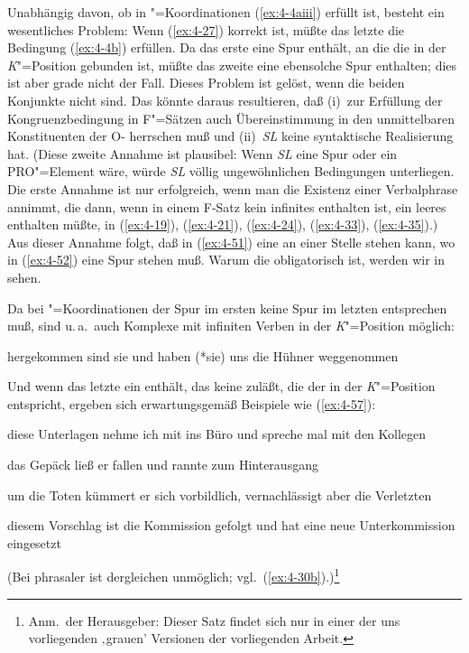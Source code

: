 \documentclass[output=paper]{langsci/langscibook}
\begin{document}
Unabhängig davon, ob in "=Koordinationen (\ref{ex:4-4aiii}) erfüllt ist, besteht ein wesentliches Problem: Wenn (\ref{ex:4-27}) korrekt ist, müßte das letzte  die Bedingung (\ref{ex:4-4b}) erfüllen. Da das erste  eine Spur enthält, an die die  in der \textit{K}{}"=Position gebunden ist, müßte das zweite  eine ebensolche Spur enthalten; dies ist aber grade nicht der Fall. Dieses Problem ist gelöst, wenn die beiden Konjunkte nicht  sind. Das könnte daraus resultieren, daß (i)~zur Erfüllung der Kongruenzbedingung in F"=Sätzen auch Übereinstimmung in den unmittelbaren Konstituenten der O- herrschen muß und (ii)~\textit{SL} keine syntaktische Realisierung hat. (Diese zweite Annahme ist plausibel: Wenn \textit{SL} eine Spur oder ein PRO"=Element wäre, würde \textit{SL} völlig ungewöhnlichen Bedingungen unterliegen. Die erste Annahme ist nur erfolgreich, wenn man die Existenz einer Verbalphrase annimmt, die dann, wenn in einem F-Satz kein infinites  enthalten ist, ein leeres  enthalten müßte, \zb in (\ref{ex:4-19}), (\ref{ex:4-21}), (\ref{ex:4-24}), (\ref{ex:4-33}), (\ref{ex:4-35}).) Aus dieser Annahme folgt, daß in (\ref{ex:4-51}) eine  an einer Stelle stehen kann, wo in (\ref{ex:4-52}) eine Spur stehen muß. Warum die  obligatorisch ist, werden wir in  sehen.

\addlines
Da bei "=Koordinationen der Spur im ersten  keine Spur im letzten  entsprechen muß, sind u.\,a.\ auch Komplexe mit infiniten Verben in der \textit{K}{}"=Position möglich:


\begin{exe}
\ex%
\label{ex:4-56}
hergekommen sind sie und haben (*sie) uns die Hühner weggenommen
\end{exe}
Und wenn das letzte  ein  enthält, das keine  zuläßt, die der  in der \textit{K}{}"=Position entspricht, ergeben sich erwartungsgemäß Beispiele wie (\ref{ex:4-57}):

\begin{exe}
\ex
\label{ex:4-57}
\begin{xlist}
\ex%
\label{ex:4-57a}
diese Unterlagen nehme ich mit ins Büro und spreche mal mit den Kollegen

\ex%
\label{ex:4-57b}
das Gepäck ließ er fallen und rannte zum Hinterausgang

\ex%
\label{ex:4-57c}
um die Toten kümmert er sich vorbildlich, vernachlässigt aber die Verletzten

\ex
diesem Vorschlag ist die Kommission gefolgt und hat eine neue Unterkommission eingesetzt
\end{xlist}
\end{exe}
(Bei phrasaler  ist dergleichen unmöglich; vgl.\ (\ref{ex:4-30b}).)\footnote{%
	Anm.\ der Herausgeber: Dieser Satz findet sich nur in einer der uns vorliegenden ‚grauen’ Versionen der vorliegenden Arbeit.%
}
\end{document}
